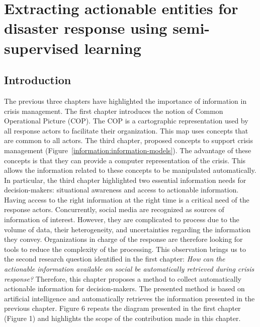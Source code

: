 \chapter{Extracting actionable entities for disaster response using semi-supervised learning}

\section*{Introduction}
The previous three chapters have highlighted the importance of information in crisis management.
The first chapter introduces the notion of Common Operational Picture (COP).
The COP is a cartographic representation used by all response actors to facilitate their organization.
This map uses concepts that are common to all actors.
The third chapter, proposed concepts to support crisis management (Figure~\ref{information:information-models}).
The advantage of these concepts is that they can provide a computer representation of the crisis.
This allows the information related to these concepts to be manipulated automatically.
In particular, the third chapter highlighted two essential information needs for decision-makers: situational awareness and access to actionable information.
Having access to the right information at the right time is a critical need of the response actors.
Concurrently, social media are recognized as sources of information of interest.
However, they are complicated to process due to the volume of data, their heterogeneity, and uncertainties regarding the information they convey.
Organizations in charge of the response are therefore looking for tools to reduce the complexity of the processing.
This observation brings us to the second research question identified in the first chapter: \emph{How can the actionable information available on social be automatically retrieved during crisis response?}
Therefore, this chapter proposes a method to collect automatically actionable information for decision-makers.
The presented method is based on artificial intelligence and automatically retrieves the information presented in the previous chapter.
Figure 6 repeats the diagram presented in the first chapter (Figure 1) and highlights the scope of the contribution made in this chapter.

